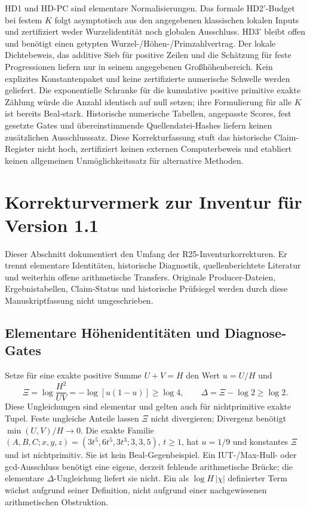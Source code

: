 \documentclass[11pt,a4paper]{article}
\begin{document}
HD1 und HD-PC sind elementare Normalisierungen. Das formale
HD2'-Budget bei festem $K$ folgt asymptotisch aus den angegebenen
klassischen lokalen Inputs und zertifiziert weder Wurzelidentität
noch globalen Ausschluss. HD3' bleibt offen und benötigt einen
getypten Wurzel-/Höhen-/Primzahlvertrag.
Der lokale Dichtebeweis, das additive Sieb für positive Zeilen und
die Schätzung für feste Progressionen liefern 
nur in seinem angegebenen Großhöhenbereich.
Kein explizites Konstantenpaket und keine zertifizierte numerische
Schwelle werden geliefert.
Die exponentielle Schranke für die kumulative positive primitive
exakte Zählung würde die Anzahl identisch auf null setzen; ihre
Formulierung für alle $K$ ist bereits Beal-stark.
Historische numerische Tabellen, angepasste Scores, fest gesetzte
Gates und übereinstimmende Quellendatei-Hashes liefern keinen
zusätzlichen Ausschlusssatz.
Diese Korrekturfassung stuft das historische Claim-Register nicht
hoch, zertifiziert keinen externen Computerbeweis und etabliert
keinen allgemeinen Unmöglichkeitssatz für alternative Methoden.

\section{Korrekturvermerk zur Inventur für Version 1.1}
\label{sec:inventory-corrections}

Dieser Abschnitt dokumentiert den Umfang der R25-Inventurkorrekturen.
Er trennt elementare Identitäten, historische Diagnostik,
quellenberichtete Literatur und weiterhin offene arithmetische Transfers.
Originale Producer-Dateien, Ergebnistabellen, Claim-Status und
historische Prüfsiegel werden durch diese Manuskriptfassung nicht
umgeschrieben.

\subsection{Elementare Höhenidentitäten und Diagnose-Gates}
Setze für eine exakte positive Summe $U+V=H$ den Wert $u=U/H$ und
\[
 \Xi=\log\frac{H^2}{UV}=-\log[u(1-u)]\ge\log4,\qquad
 \Delta=\Xi-\log2\ge\log2.
\]
Diese Ungleichungen sind elementar und gelten auch für nichtprimitive
exakte Tupel. Feste ungleiche Anteile lassen $\Xi$ nicht divergieren;
Divergenz benötigt $\min(U,V)/H\to0$.
Die exakte Familie
$(A,B,C;x,y,z)=(3t^5,6t^5,3t^3;3,3,5)$, $t\ge1$,
hat $u=1/9$ und konstantes $\Xi$ und ist nichtprimitiv.
Sie ist kein Beal-Gegenbeispiel.
Ein IUT-/Max-Hull- oder gcd-Ausschluss benötigt eine eigene,
derzeit fehlende arithmetische Brücke; die elementare
$\Delta$-Ungleichung liefert sie nicht.
Ein als $\log H\,|\chi|$ definierter Term wächst aufgrund seiner
Definition, nicht aufgrund einer nachgewiesenen arithmetischen
Obstruktion.
\end{document}

